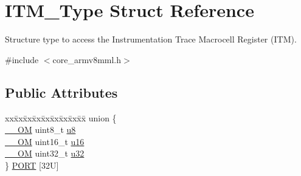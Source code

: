 \hypertarget{struct_i_t_m___type}{}\section{I\+T\+M\+\_\+\+Type Struct Reference}
\label{struct_i_t_m___type}


Structure type to access the Instrumentation Trace Macrocell Register (I\+TM).  




{\ttfamily \#include $<$core\+\_\+armv8mml.\+h$>$}

\subsection*{Public Attributes}
\begin{DoxyCompactItemize}
\item 
\begin{tabbing}
xx\=xx\=xx\=xx\=xx\=xx\=xx\=xx\=xx\=\kill
union \{\\
\>\hyperlink{core__sc300_8h_a0ea2009ed8fd9ef35b48708280fdb758}{\_\_OM} uint8\_t \hyperlink{struct_i_t_m___type_ae773bf9f9dac64e6c28b14aa39f74275}{u8}\\
\>\hyperlink{core__sc300_8h_a0ea2009ed8fd9ef35b48708280fdb758}{\_\_OM} uint16\_t \hyperlink{struct_i_t_m___type_a962a970dfd286cad7f8a8577e87d4ad3}{u16}\\
\>\hyperlink{core__sc300_8h_a0ea2009ed8fd9ef35b48708280fdb758}{\_\_OM} uint32\_t \hyperlink{struct_i_t_m___type_a5834885903a557674f078f3b71fa8bc8}{u32}\\
\} \hyperlink{struct_i_t_m___type_a7010d53d9f2b725fba177015cbdc6bc2}{PORT} \mbox{[}32U\mbox{]}\\


\end{tabbing}
\end{DoxyCompactItemize}
